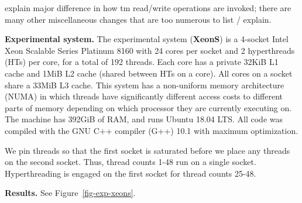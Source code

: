 explain major difference in how tm read/write operations are invoked; there are many other miscellaneous changes that are too numerous to list / explain.

\vspace{1mm}\noindent\textbf{Experimental system.}
The experimental system (\textbf{XeonS}) is a 4-socket Intel Xeon Scalable Series Platinum 8160 with 24 cores per socket and 2 hyperthreads (HTs) per core, for a total of 192 threads.
Each core has a private 32KiB L1 cache and 1MiB L2 cache (shared between HTs on a core).
All cores on a socket share a 33MiB L3 cache.
This system has a non-uniform memory architecture (NUMA) in which threads have significantly different access costs to different parts of memory depending on which processor they are currently executing on.
The machine has 392GiB of RAM, and runs Ubuntu 18.04 LTS.
All code was compiled with the GNU C++ compiler (G++) 10.1 with maximum optimization.

We pin threads so that the first socket is saturated before we place any threads on the second socket.
Thus, thread counts 1-48 run on a single socket.
Hyperthreading is engaged on the first socket for thread counts 25-48.


\vspace{1mm}\noindent\textbf{Results.}
See Figure~\ref{fig-exp-xeons}.